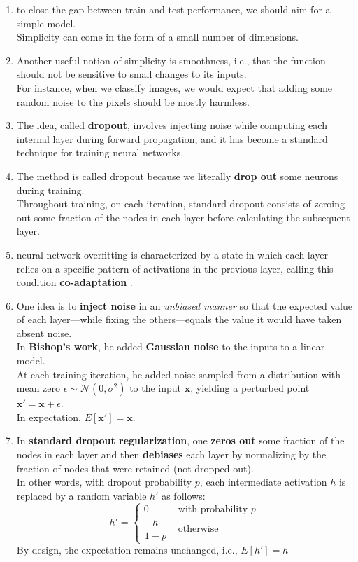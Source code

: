 \begin{enumerate}
    \item to close the gap between train and test performance, we should aim for a simple model.\\ 
    Simplicity can come in the form of a small number of dimensions.

    \item Another useful notion of simplicity is smoothness, i.e., that the function should not be sensitive to small changes to its inputs.\\
    For instance, when we classify images, we would expect that adding some random noise to the pixels should be mostly harmless.

    \item The idea, called \textbf{dropout}, involves injecting noise while computing each internal layer during forward propagation, and it has become a standard technique for training neural networks. 
    
    \item The method is called dropout because we literally \textbf{drop out} some neurons during training.\\
    Throughout training, on each iteration, standard dropout consists of zeroing out some fraction of the nodes in each layer before calculating the subsequent layer.

    \item neural network overfitting is characterized by a state in which each layer relies on a specific pattern of activations in the previous layer, calling this condition \textbf{co-adaptation} .

    \item One idea is to \textbf{inject noise} in an \textit{unbiased manner} so that the expected value of each layer—while fixing the others—equals the value it would have taken absent noise.\\
    In \textbf{Bishop’s work}, he added \textbf{Gaussian noise} to the inputs to a linear model.\\
    At each training iteration, he added noise sampled from a distribution with mean zero $\epsilon \sim \mathcal{N}(0,\sigma^2)$ to the input $\mathbf{x}$, yielding a perturbed point $\mathbf{x}' = \mathbf{x} + \epsilon$. \\
    In expectation, $E[\mathbf{x}'] = \mathbf{x}$.

    \item In \textbf{standard dropout regularization}, one \textbf{zeros out} some fraction of the nodes in each layer and then \textbf{debiases} each layer by normalizing by the fraction of nodes that were retained (not dropped out).\\
    In other words, with dropout probability $p$, each intermediate activation $h$ is replaced by a random variable $h'$ as follows:
    \[
        h' =
        \begin{cases}
            0 & \textrm{ with probability } p \\
            \dfrac{h}{1-p} & \textrm{ otherwise}
        \end{cases}
    \]
    By design, the expectation remains unchanged, i.e., $E[h'] = h$


\end{enumerate}
